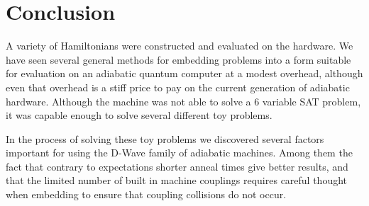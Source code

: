 \chapter{Conclusion}
A variety of Hamiltonians were constructed and evaluated on the \machine hardware.  We have seen several general methods for embedding problems into a form suitable for evaluation on an adiabatic quantum computer at a modest overhead, although even that overhead is a stiff price to pay on the current generation of adiabatic hardware.  Although the machine was not able to solve a 6 variable SAT problem, it was capable enough to solve several different toy problems.

In the process of solving these toy problems we discovered several factors important for using the D-Wave family of adiabatic machines.  Among them the fact that contrary to expectations shorter anneal times give better results, and that the limited number of built in machine couplings requires careful thought when embedding to ensure that coupling collisions do not occur.
